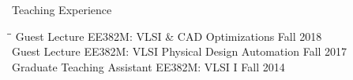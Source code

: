 \begin{rSection}{Teaching Experience}

\begin{tabbing}
\hspace{3.3in}\= \hspace{3.1in}\= \kill
Guest Lecture \> EE382M: VLSI \& CAD Optimizations \> Fall 2018 \\
Guest Lecture \> EE382M: VLSI Physical Design Automation \> Fall 2017 \\
Graduate Teaching Assistant \> EE382M: VLSI I \> Fall 2014 
\end{tabbing}

\end{rSection}
